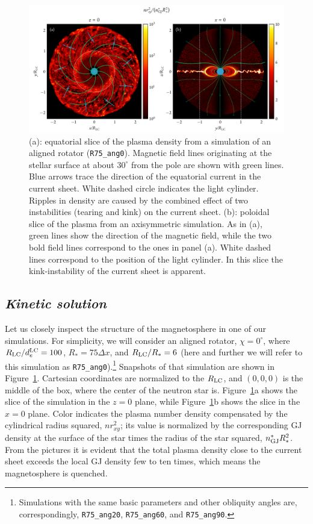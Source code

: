 \begin{figure}[htb]
\centering
\includegraphics[width=\columnwidth]{figures/ch3-pulsar/fig2.pdf}
\caption{(a): equatorial slice of the plasma density from a simulation of an aligned rotator (\texttt{R75\_ang0}). Magnetic field lines originating at the stellar surface at about $30^\circ$ from the pole are shown with green lines. Blue arrows trace the direction of the equatorial current in the current sheet. White dashed circle indicates the light cylinder. Ripples in density are caused by the combined effect of two instabilities (tearing and kink) on the current sheet. (b): poloidal slice of the plasma from an axisymmetric simulation. As in (a), green lines show the direction of the magnetic field, while the two bold field lines correspond to the ones in panel (a). White dashed lines correspond to the position of the light cylinder. In this slice the kink-instability of the current sheet is apparent.}
\label{fig:psr-pulsarslice}
\end{figure}

\subsection*{\small\it Kinetic solution}
\label{psr:sub_kinetic_sol}

Let us closely inspect the structure of the magnetosphere in one of our simulations. For simplicity, we will consider an aligned rotator, $\chi=0^\circ$, where $R_{\rm LC} / d_e^{\rm LC} = 100$, $R_* = 75\Delta x$, and $R_{\rm LC} / R_* = 6$ (here and further we will refer to this simulation as \texttt{R75\_ang0}).\footnote{Simulations with the same basic parameters and other obliquity angles are, correspondingly, \texttt{R75\_ang20}, \texttt{R75\_ang60}, and \texttt{R75\_ang90}.} Snapshots of that simulation are shown in Figure~\ref{fig:psr-pulsarslice}. Cartesian coordinates are normalized to the $R_{\rm LC}$, and $(0, 0, 0)$ is the middle of the box, where the center of the neutron star is. Figure~\ref{fig:psr-pulsarslice}a shows the slice of the simulation in the $z=0$ plane, while Figure~\ref{fig:psr-pulsarslice}b shows the slice in the $x=0$ plane. Color indicates the plasma number density compensated by the cylindrical radius squared, $n r_{xy}^2$; its value is normalized by the corresponding GJ density at the surface of the star times the radius of the star squared, $n_{\rm GJ}^* R_*^2$. From the pictures it is evident that the total plasma density close to the current sheet exceeds the local GJ density few to ten times, which means the magnetosphere is quenched.

